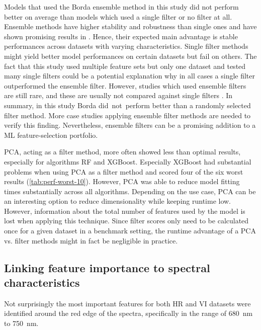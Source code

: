 \documentclass[remotesensing,article,submit,moreauthors,pdftex]{Definitions/mdpi}
\begin{document}
Models that used the Borda ensemble method in this study did not perform better on average than models which used a single filter or no filter at all.
Ensemble methods have higher stability and robustness than single ones and have shown promising results in \cite{drotar2017}.
Hence, their expected main advantage is stable performances across datasets with varying characteristics.
Single filter methods might yield better model performances on certain datasets but fail on others.
The fact that this study used multiple feature sets but only one dataset and tested many single filters could be a potential explanation why in all cases a single filter outperformed the ensemble filter.
However, studies which used ensemble filters are still rare, and these are usually not compared against single filters \cite{ghosh2019}.
In summary, in this study Borda did\ not\ perform better than a randomly selected filter method.
More case studies applying ensemble filter methods are needed to verify this finding.
Nevertheless, ensemble filters can be a promising addition to a ML feature-selection portfolio.

PCA, acting as a filter method, more often showed less than optimal results, especially for algorithms RF and XGBoost.
Especially XGBoost had substantial problems when using PCA as a filter method and scored four of the six worst results (\autoref{tab:perf-worst-10}).
However, PCA was able to reduce model fitting times substantially across all algorithms.
Depending on the use case, PCA can be an interesting option to reduce dimensionality while keeping runtime low.
However, information about the total number of features used by the model is lost when applying this technique.
Since filter scores only need to be calculated once for a given dataset in a benchmark setting, the runtime advantage of a PCA vs. filter methods might in fact be negligible in practice.

\subsection{Linking feature importance to spectral characteristics}

Not surprisingly the most important features for both HR and VI datasets were identified around the red edge of the spectra, specifically in the range of 680~nm to 750~nm.
\end{document}
